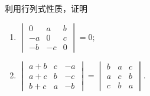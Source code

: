 \begin{example}
  利用行列式性质，证明
\begin{multicols}{2}
\begin{enumerate}[(1)]
  \item $\begin{vmatrix}0&a&b\\-a&0&c\\-b&-c&0\end{vmatrix}=0;$
  \item $\begin{vmatrix}a+b&c&-a\\a+c&b&-c\\b+c&a&-b\end{vmatrix}=\begin{vmatrix}b&a&c\\a&c&b\\c&b&a\end{vmatrix}.$
\end{enumerate}  
\end{multicols}
\end{example}

